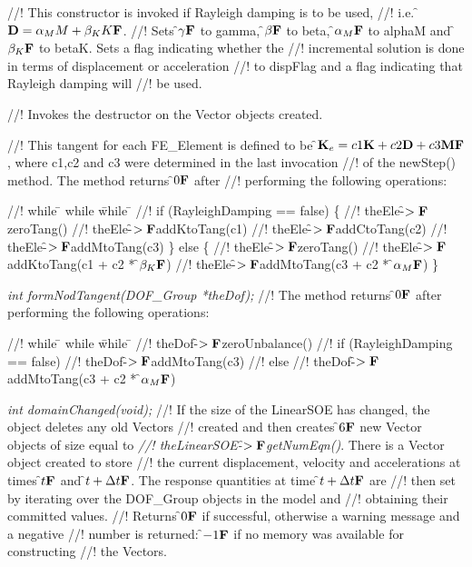 //! This constructor is invoked if Rayleigh damping is to be used, 
//! i.e. \f${\bf D} = \alpha_M M + \beta_K K{\bf F}$. 
//! Sets \f$\gamma{\bf F}$ to \p gamma, \f$\beta{\bf F}$ to \p beta, \f$\alpha_M{\bf F}$ to
\p alphaM and \f$\beta_K{\bf F}$ to \p betaK. Sets a flag indicating whether the
//! incremental solution is done in terms of displacement or acceleration
//! to \p dispFlag and a flag indicating that Rayleigh damping will 
//! be used. 

//! Invokes the destructor on the Vector objects created.

//! This tangent for each FE\_Element is defined to be \f${\bf K}_e = c1 {\bf K} + c2
{\bf D} + c3 {\bf M}{\bf F}$, where c1,c2 and c3 were determined in the last invocation
//! of the newStep() method.  The method returns \f$0{\bf F}$ after
//! performing the following operations:
\begin{tabbing}
//! while \= \+ while \= while \= \kill
//! if (RayleighDamping == false) \{ \+
//! theEle-\f$>{\bf F}$zeroTang()
//! theEle-\f$>{\bf F}$addKtoTang(c1)
//! theEle-\f$>{\bf F}$addCtoTang(c2)
//! theEle-\f$>{\bf F}$addMtoTang(c3)  \-
\} else \{ \+
//! theEle-\f$>{\bf F}$zeroTang()
//! theEle-\f$>{\bf F}$addKtoTang(c1 + c2 * \f$\beta_K{\bf F}$)
//! theEle-\f$>{\bf F}$addMtoTang(c3 + c2 * \f$\alpha_M{\bf F}$)  \- 
\}
\end{tabbing}



{\em int formNodTangent(DOF\_Group *theDof);}
//! The method returns \f$0{\bf F}$ after performing the following operations:
\begin{tabbing}
//! while \= \+ while \= while \= \kill
//! theDof-\f$>{\bf F}$zeroUnbalance()
//! if (RayleighDamping == false)  \+
//! theDof-\f$>{\bf F}$addMtoTang(c3)  \-
//! else \+
//! theDof-\f$>{\bf F}$addMtoTang(c3 + c2 * \f$\alpha_M{\bf F}$)  \- 
\end{tabbing}


{\em int domainChanged(void);}
//! If the size of the LinearSOE has changed, the object deletes any old Vectors
//! created and then creates \f$6{\bf F}$ new Vector objects of size equal to {\em
//! theLinearSOE-\f$>{\bf F}$getNumEqn()}. There is a Vector object created to store
//! the current displacement, velocity and accelerations at times \f$t{\bf F}$ and
\f$t + \Delta t{\bf F}$. The response quantities at time \f$t + \Delta t{\bf F}$ are
//! then set by iterating over the DOF\_Group objects in the model and
//! obtaining their committed values. 
//! Returns \f$0{\bf F}$ if successful, otherwise a warning message and a negative
//! number is returned: \f$-1{\bf F}$ if no memory was available for constructing
//! the Vectors.

